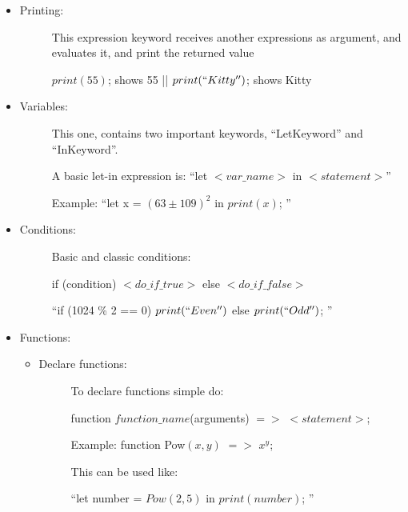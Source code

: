 \begin{itemize}
\begin{itemize}
                \item Printing:
                    \begin{description}
                    \item[] This expression keyword receives another expressions as argument, and evaluates it, and print the returned value
                    \item[] $print(55)$; shows 55 || $print(``Kitty'')$; shows Kitty
                    \end{description}
                \item Variables:
                    \begin{description}
                        \item[] This one, contains two important keywords, ``LetKeyword'' and ``InKeyword''.
                        \item[] A basic let-in expression is: ``let $<var\_name>$ in $<statement>$''
                        \item[] Example: ``let x = ${(63 \pm 109)}^2$ in $print{(x)}$; ''
                    \end{description}
                \item Conditions:
                    \begin{description}
                        \item[] Basic and classic conditions:
                        \item[] if (condition) $<do\_if\_true>$ else $<do\_if\_false>$
                        \item[] ``if (1024 \% 2 == 0) $print(``Even'')$ else $print(``Odd'')$; ''
                    \end{description}
                \item Functions:
                    \begin{itemize}
                        \item Declare functions:
                        \begin{description}
                            \item[] To declare functions simple do:
                            \item[] function $function\_name${(arguments)} $=>$ $<statement>$;
                            \item[] Example: function Pow$(x,y)$ $=>$ $x^y$;
                            \item[] This can be used like:
                            \item[] ``let number = $Pow(2,5)$ in $print(number)$; ''

\end{description}
\end{itemize}
\end{itemize}
\end{itemize}
